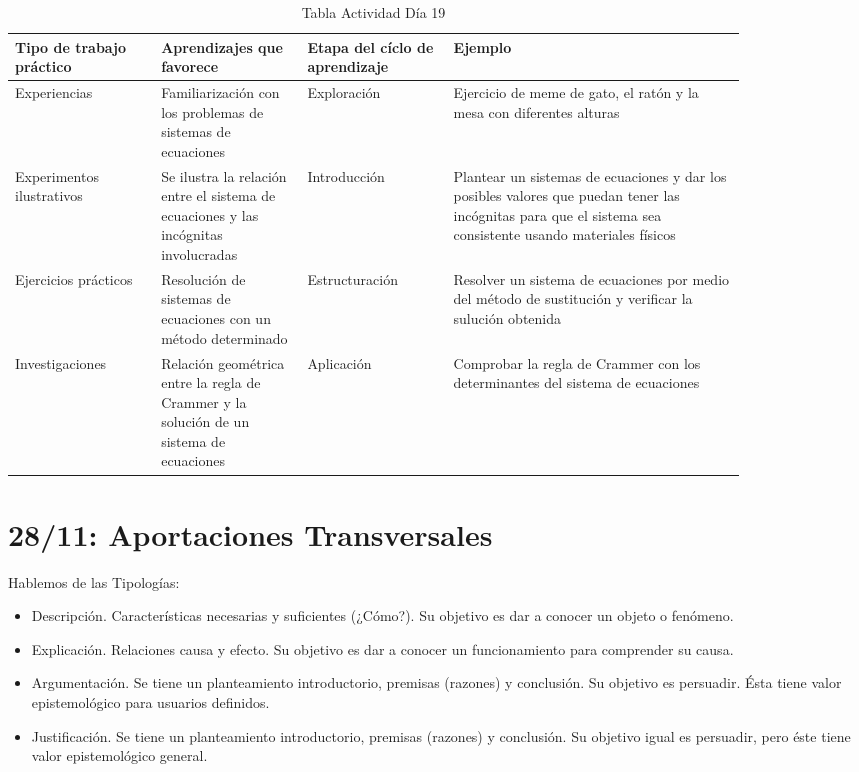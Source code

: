 \documentclass[12pt]{report}
\newcounter{it}
\theoremstyle{largebreak}
\begin{document}
    \begin{table}[ht]
        \centering
        \begin{tabular}{p{0.17\linewidth} | p{0.17\linewidth} | p{0.17\linewidth} | p{0.34\linewidth}}
            Tipo de trabajo práctico & Aprendizajes que favorece & Etapa del cíclo de aprendizaje & Ejemplo \\
            \hline
             Experiencias & Familiarización con los problemas de sistemas de ecuaciones & Exploración & Ejercicio de meme de gato, el ratón y la mesa con diferentes alturas \\
             Experimentos ilustrativos & Se ilustra la relación entre el sistema de ecuaciones y las incógnitas involucradas & Introducción & Plantear un sistemas de ecuaciones y dar los posibles valores que puedan tener las incógnitas para que el sistema sea consistente usando materiales físicos \\
             Ejercicios prácticos & Resolución de sistemas de ecuaciones con un método determinado & Estructuración & Resolver un sistema de ecuaciones por medio del método de sustitución y verificar la sulución obtenida \\
             Investigaciones & Relación geométrica entre la regla de Crammer y la solución de un sistema de ecuaciones & Aplicación & Comprobar la regla de Crammer con los determinantes del sistema de ecuaciones \\
        \end{tabular}
        \caption{Tabla Actividad Día 19}
        \label{tab:my_label}
    \end{table}

    \section{28/11: Aportaciones Transversales}

    Hablemos de las Tipologías:
    \begin{itemize}
        \item Descripción. Características necesarias y suficientes (¿Cómo?). Su objetivo es dar a conocer un objeto o fenómeno.
        \item Explicación. Relaciones causa y efecto. Su objetivo es dar a conocer un funcionamiento para comprender su causa.
        \item Argumentación. Se tiene un planteamiento introductorio, premisas (razones) y conclusión. Su objetivo es persuadir. Ésta tiene valor epistemológico para usuarios definidos.
        \item Justificación. Se tiene un planteamiento introductorio, premisas (razones) y conclusión. Su objetivo igual es persuadir, pero éste tiene valor epistemológico general.
    \end{itemize}
\end{document}
